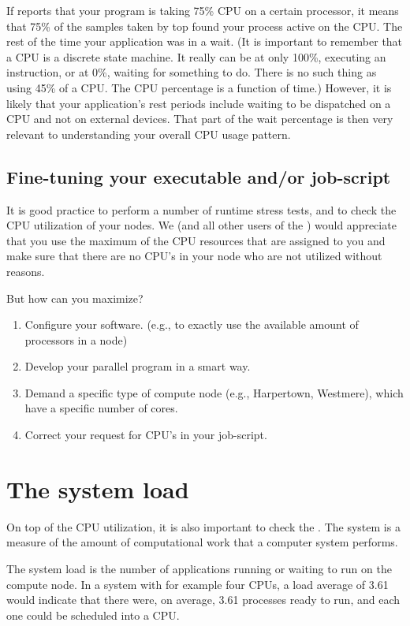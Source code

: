 If  reports that your program is taking 75\% CPU on a
certain processor, it means that 75\% of the samples taken by top found your
process active on the CPU. The rest of the time your application was in a wait.
(It is important to remember that a CPU is a discrete state machine. It really
can be at only 100\%, executing an instruction, or at 0\%, waiting for
something to do. There is no such thing as using 45\% of a CPU. The CPU
percentage is a function of time.) However, it is likely that your
application's rest periods include waiting to be dispatched on a CPU and not on
external devices. That part of the wait percentage is then very relevant to
understanding your overall CPU usage pattern.

\subsection{Fine-tuning your executable and/or job-script}

It is good practice to perform a number of runtime stress tests, and to check
the CPU utilization of your nodes. We (and all other users of the \hpc) would
appreciate that you use the maximum of the CPU resources that are assigned to
you and make sure that there are no CPU's in your node who are not utilized
without reasons.

But how can you maximize?

\begin{enumerate}
\item  Configure your software. (e.g., to exactly use the available amount of processors in a node)
\item  Develop your parallel program in a smart way.
\item  Demand a specific type of compute node (e.g., Harpertown, Westmere), which have a specific number of cores.
\item  Correct your request for CPU's in your job-script.
\end{enumerate}

\section{The system load}

On top of the CPU utilization, it is also important to check the .  The system  is a measure of the amount of computational
work that a computer system performs.

The system load is the number of applications running or waiting to run on the
compute node.  In a system with for example four CPUs, a load average of 3.61
would indicate that there were, on average, 3.61 processes ready to run, and
each one could be scheduled into a CPU.


